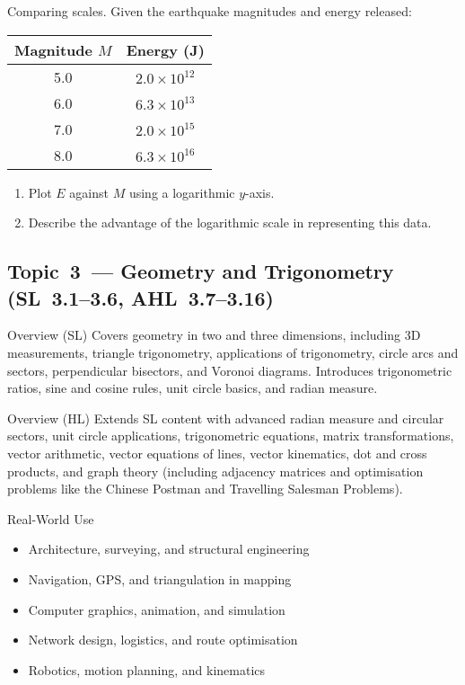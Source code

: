 \documentclass[11pt]{article}
\def\textbf#1{#1}%
\newcommand{\tocsubsection}[1]{\subsection{#1}}
\newcounter{question}
\begin{document}
\begin{question}
\textbf{Comparing scales.}
Given the earthquake magnitudes and energy released:

\begin{center}
\begin{tabular}{c|c}
Magnitude $M$ & Energy (J) \\
\hline
5.0 & $2.0\times 10^{12}$ \\
6.0 & $6.3\times 10^{13}$ \\
7.0 & $2.0\times 10^{15}$ \\
8.0 & $6.3\times 10^{16}$
\end{tabular}
\end{center}

\begin{enumerate}
    \item Plot $E$ against $M$ using a logarithmic $y$-axis.
    \item Describe the advantage of the logarithmic scale in representing this data.
\end{enumerate}
\end{question}





\tocsubsection{Topic 3 — Geometry and Trigonometry (SL 3.1–3.6, AHL 3.7–3.16)}
\textbf{Overview (SL)}  
Covers geometry in two and three dimensions, including 3D measurements, triangle trigonometry, applications of trigonometry, circle arcs and sectors, perpendicular bisectors, and Voronoi diagrams. Introduces trigonometric ratios, sine and cosine rules, unit circle basics, and radian measure.

\textbf{Overview (HL)}  
Extends SL content with advanced radian measure and circular sectors, unit circle applications, trigonometric equations, matrix transformations, vector arithmetic, vector equations of lines, vector kinematics, dot and cross products, and graph theory (including adjacency matrices and optimisation problems like the Chinese Postman and Travelling Salesman Problems).

\textbf{Real-World Use}  
\begin{itemize}
  \item Architecture, surveying, and structural engineering
  \item Navigation, GPS, and triangulation in mapping
  \item Computer graphics, animation, and simulation
  \item Network design, logistics, and route optimisation
  \item Robotics, motion planning, and kinematics
\end{itemize}
\end{document}
